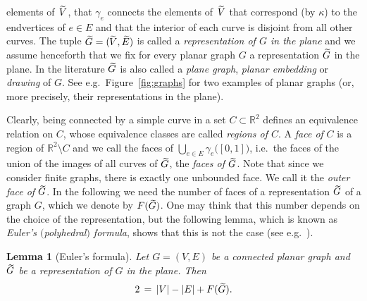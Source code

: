 \documentclass{dis}
\newtheorem{lemma}[theorem]{Lemma}
\theoremstyle{citing}
\begin{document}
elements of ${\,\raisebox{2pt}{ ${\widetilde{{}}}$ }\mkern-13mu V}$, that ${\gamma}_e$ connects the elements of ${\,\raisebox{2pt}{ ${\widetilde{{}}}$ }\mkern-13mu V}$ that 
correspond (by $\kappa$) to the endvertices of $e\in E$ and that 
the interior of each curve is disjoint from all other curves. 
The tuple ${\,\raisebox{2pt}{ ${\widetilde{{}}}$ }\mkern-15mu G}=(\!{\,\raisebox{2pt}{ ${\widetilde{{}}}$ }\mkern-13mu V},{\,\raisebox{2pt}{ ${\widetilde{{}}}$ }\mkern-15mu E})$ is called a 
\emph{representation of $G$ in the plane} 
and we assume henceforth that we fix for every planar graph $G$ 
a representation ${\,\raisebox{2pt}{ ${\widetilde{{}}}$ }\mkern-15mu G}$ in the plane. 
In the literature ${\,\raisebox{2pt}{ ${\widetilde{{}}}$ }\mkern-15mu G}$ is also called a \emph{plane graph}, 
\emph{planar embedding} or \emph{drawing} of $G$.
See e.g.~Figure~\ref{fig:graphs} for two examples of planar graphs 
(or, more precisely, their representations in the plane).

Clearly, being connected by a simple curve in a set $C\subset{\ensuremath{\mathbb{R}}}^2$ 
defines an equivalence relation on $C$, whose equivalence classes 
are called \emph{regions of $C$}.
A \emph{face of} $C$ is a region of ${\ensuremath{\mathbb{R}}}^2\setminus C$ and we call 
the faces of $\bigcup_{e\in E}{\gamma}_e\bigl([0,1]\bigr)$, i.e.~the faces 
of the union of the images of all curves of ${\,\raisebox{2pt}{ ${\widetilde{{}}}$ }\mkern-15mu G}$, the 
\emph{faces of ${\,\raisebox{2pt}{ ${\widetilde{{}}}$ }\mkern-15mu G}$}. 
Note 
that since we consider finite graphs, there is exactly one 
unbounded face. We call it the \emph{outer face of} ${\,\raisebox{2pt}{ ${\widetilde{{}}}$ }\mkern-15mu G}$.
In the following we need the number of faces of a representation 
${\,\raisebox{2pt}{ ${\widetilde{{}}}$ }\mkern-15mu G}$ of a graph $G$, which we denote by $F({\,\raisebox{2pt}{ ${\widetilde{{}}}$ }\mkern-15mu G})$. 
One may think that this number depends on the choice of the 
representation, but the following lemma, which is known as 
\emph{Euler's $($polyhedral\/$)$ formula}, shows that this 
is not the case (see e.g.~\cite[Prop.~2.2.3]{Mohar}).

\begin{lemma}[Euler's formula]\label{lemma:euler}
Let $G=(V,E)$ be a connected planar graph and ${\,\raisebox{2pt}{ ${\widetilde{{}}}$ }\mkern-15mu G}$ be a 
representation of $G$ in the plane. Then
\[
2 \,=\, {\left\vert {V} \right\vert} - {\left\vert {E} \right\vert} + F({\,\raisebox{2pt}{ ${\widetilde{{}}}$ }\mkern-15mu G}).
\]
\end{lemma}
 
\end{document}
